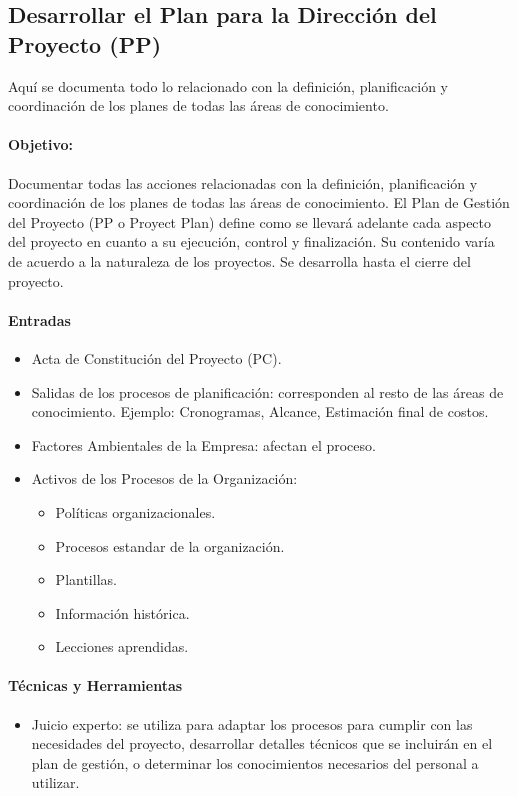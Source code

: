 \documentclass[a4paper,twosides]{article}
\newlength{\wideitemsep}
\let\olditem\item
\renewcommand{\item}{\setlength{\itemsep}{\wideitemsep}\olditem}
\begin{document}
\subsection{Desarrollar el Plan para la Dirección del Proyecto (PP)} \label{sec:desarrollar_pp}
Aquí se documenta todo lo relacionado con la definición, planificación y coordinación de los planes de todas las áreas de conocimiento.
\paragraph{Objetivo:} Documentar todas las acciones relacionadas con la definición, planificación y coordinación de los planes de todas las áreas de conocimiento. El Plan de Gestión del Proyecto (PP o Proyect Plan) define como se llevará adelante cada aspecto del proyecto en cuanto a su ejecución, control y finalización. Su contenido varía de acuerdo a la naturaleza de los proyectos. Se desarrolla hasta el cierre del proyecto.
\paragraph{Entradas}
\begin{itemize}
\item Acta de Constitución del Proyecto (PC).
\item Salidas de los procesos de planificación: corresponden al resto de las áreas de conocimiento. Ejemplo: Cronogramas, Alcance, Estimación final de costos.
\item Factores Ambientales de la Empresa: afectan el proceso.
\item Activos de los Procesos de la Organización:
\begin{itemize}
\item Políticas organizacionales.
\item Procesos estandar de la organización.
\item Plantillas.
\item Información histórica.
\item Lecciones aprendidas.
\end{itemize}
\end{itemize}
\paragraph{Técnicas y Herramientas}
\begin{itemize}
\item Juicio experto: se utiliza para adaptar los procesos para cumplir con las necesidades del proyecto, desarrollar detalles técnicos que se incluirán en el plan de gestión, o determinar los conocimientos necesarios del personal a utilizar.
\end{itemize}
\end{document}
